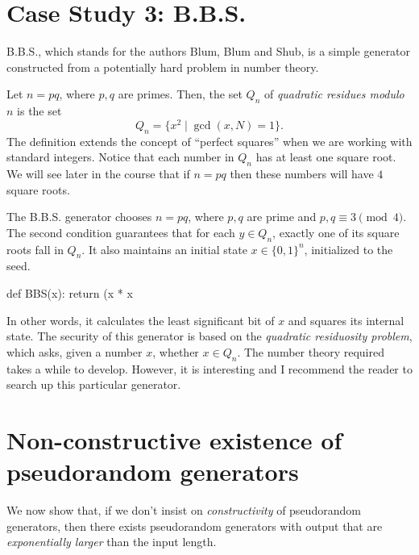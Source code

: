 \section{Case Study 3: B.B.S.}\label{3-Case-Study--BBS}

B.B.S., which stands for the authors Blum, Blum and Shub, is a simple
generator constructed from a potentially hard problem in number theory.

Let \(n=pq\), where \(p,q\) are primes. Then, the set \(Q_n\) of
\emph{quadratic residues modulo \(n\)} is the set
\begin{equation*}
Q_n=\{x^2\mid \gcd(x,N)=1\}.
\end{equation*}
The definition extends the concept of ``perfect squares'' when we are
working with standard integers. Notice that each number in \(Q_n\) has
at least one square root. We will see later in the course that if
\(n=pq\) then these numbers will have \(4\) square roots.

The B.B.S. generator chooses \(n=pq\), where \(p,q\) are prime and
\(p,q\equiv 3\pmod{4}\). The second condition guarantees that for each
\(y\in Q_n\), exactly one of its square roots fall in \(Q_n\). It also
maintains an initial state \(x\in\{0,1\}^n\), initialized to the seed.

\begin{code}
def BBS(x):
    return (x * x %
\end{code}

In other words, it calculates the least significant bit of \(x\) and
squares its internal state. The security of this generator is based on
the \emph{quadratic residuosity problem}, which asks, given a number
\(x\), whether \(x\in Q_n\). The number theory required takes a while to
develop. However, it is interesting and I recommend the reader to search
up this particular generator.

\section{Non-constructive existence of pseudorandom
generators}\label{3-Non-constructive-exist}

We now show that, if we don't insist on \emph{constructivity} of
pseudorandom generators, then there exists pseudorandom generators with
output that are \emph{exponentially larger} than the input length.

\hypertarget{prgexist}{}

